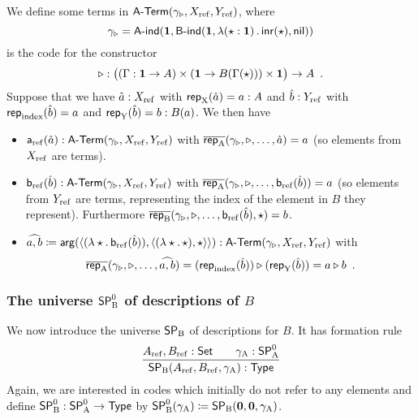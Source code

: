 \documentclass{article}
\begin{document}
\begin{example}
  We define some terms in $\mathsf{A}\text{-}\mathsf{Term}(\gamma_{\triangleright}, X_{\mathrm{ref}}, Y_{\mathrm{ref}})$, where
  \[
  \gamma_{\triangleright} = \mathsf{A}\text{-}\mathsf{ind}(\mathbf{1}, \mathsf{B}\text{-}\mathsf{ind}(\mathbf{1},
  \lambda (\star : \mathbf{1})\,.\,\mathsf{inr}(\star), \mathsf{nil}))
  \]
  is the code for the constructor
  \[
  \triangleright : \big((\Gamma : \mathbf{1} \to A) \times (\mathbf{1} \to B(\Gamma(\star))) \times \mathbf{1}\big) \to A \enspace .
  \]
  Suppose that we have $\hat{a} : X_{\mathrm{ref}}$ with $\mathsf{rep}_{\mathrm{X}}(\hat{a}) = a : A$
  and $\hat{b} : Y_{\mathrm{ref}}$ with $\mathsf{rep}_{\mathrm{index}}(\hat{b}) = a$ and
  $\mathsf{rep}_{\mathrm{Y}}(\hat{b}) = b : B(a)$. We then have 
  \begin{itemize}
  \item $\mathsf{a}_{\mathrm{ref}}(\hat{a}) : \mathsf{A}\text{-}\mathsf{Term}(\gamma_{\triangleright}, X_{\mathrm{ref}}, Y_{\mathrm{ref}})$ with
  $\overline{\mathsf{rep}_{\mathrm{A}}}(\gamma_{\triangleright}, \triangleright, \ldots, \hat{a}) =
  a$ (so elements from $X_{\mathrm{ref}}$ are terms).
\item $\mathsf{b}_{\mathrm{ref}}(\hat{b}) : \mathsf{A}\text{-}\mathsf{Term}(\gamma_{\triangleright}, X_{\mathrm{ref}},
  Y_{\mathrm{ref}})$ with $\overline{\mathsf{rep}_{\mathrm{A}}}(\gamma_{\triangleright}, \triangleright,
  \ldots, \mathsf{b}_{\mathrm{ref}}(\hat{b})) = a$ (so elements from $Y_{\mathrm{ref}}$ are
  terms, representing the index of the element in $B$ they
  represent). Furthermore $\overline{\mathsf{rep}_{\mathrm{B}}}(\gamma_{\triangleright}, \triangleright, \ldots, \mathsf{b}_{\mathrm{ref}}(\hat{b}),
  \star) = b$.
\item  $\widehat{a,b} \coloneqq \mathsf{arg}(\langle (\lambda \star.\,\mathsf{b}_{\mathrm{ref}}(\hat{b})) ,
  \langle (\lambda \star.\,\star), \star\rangle\rangle) :
  \mathsf{A}\text{-}\mathsf{Term}(\gamma_{\triangleright}, X_{\mathrm{ref}}, Y_{\mathrm{ref}})$ with
  \[
      \overline{\mathsf{rep}_{\mathrm{A}}}(\gamma_{\triangleright}, \triangleright, \ldots, \widehat{a,b})
    = (\mathsf{rep}_{\mathrm{index}}(\hat{b})) \triangleright (\mathsf{rep}_{\mathrm{Y}}(\hat{b})) 
    = a \triangleright b \enspace .
  \]
\blackqed
\end{itemize}
\end{example}

\subsubsection{The universe $\mathsf{SP}^{0}_{\mathrm{B}}$ of descriptions of $B$}
\label{sec:SPB}

We now introduce the universe $\mathsf{SP}_{\mathrm{B}}$ of descriptions
for $B$. It has formation rule
%
\[
\infer{\SPB(\Aref, \Bref, \gammaA) : \TYPE}{\Aref, \Bref : \Set & \quad \gammaA : \SPAp}
\]
%
Again, we are interested in codes which initially do not refer to
any elements and define $\mathsf{SP}^{0}_{\mathrm{B}} : \mathsf{SP}^{0}_{\mathrm{A}} \to \mathsf{Type}$ by $\mathsf{SP}^{0}_{\mathrm{B}}(\gamma_{\mathrm{A}})
\coloneqq \mathsf{SP}_{\mathrm{B}}(\mathbf{0}, \mathbf{0}, \gamma_{\mathrm{A}})$.
\end{document}

